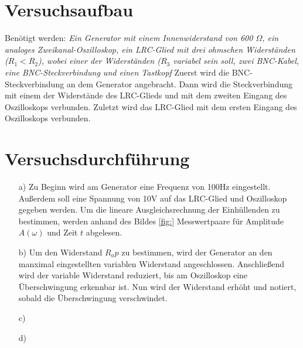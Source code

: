 \section{Versuchsaufbau}\justifying
Benötigt werden: \textit{Ein Generator mit einem Innenwiderstand von 600 $\Omega$, 
ein analoges Zweikanal-Oszilloskop, ein LRC-Glied mit drei ohmschen Widerständen 
($R_1 < R_2$), wobei einer der Widerständen ($R_3$ variabel sein soll, 
zwei BNC-Kabel, eine BNC-Steckverbindung und einen Tastkopf}
Zuerst wird die BNC-Steckverbindung an dem Generator angebracht. 
Dann wird die Steckverbindung mit einem der Widerstände des LRC-Glieds und mit dem zweiten 
Eingang des Oszilloskops verbunden.
Zuletzt wird das LRC-Glied mit dem ersten Eingang des Oszilloskops verbunden.



\section{Versuchsdurchführung}\justifying

 \begin{enumerate}

    \item[a)] \justifying Zu Beginn wird am Generator eine Frequenz von 100Hz 
    eingestellt. Außerdem soll eine Spannung von 10V auf das LRC-Glied und Oszilloskop
    gegeben werden. 
    Um die lineare Ausgleichsrechnung der Einhüllenden zu bestimmen,
    werden anhand des Bildes \ref{fig:} Messwertpaare für Amplitude $A(\omega)$ und Zeit 
    $t$ abgelesen. 

    \item[b)] \justifying Um den Widerstand $R_ap$ zu bestimmen, wird der Generator 
    an den manximal eingestellten variablen Widerstand angeschlossen. Anschließend wird 
    der variable Widerstand reduziert, bis am Oszilloskop eine Überschwingung erkennbar 
    ist. Nun wird der Widerstand erhöht und notiert, sobald die Überschwingung verschwindet.
  
    \item[c)] \justifying 
  
    \item[d)] \justifying 

  \end{enumerate}


